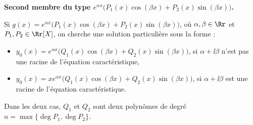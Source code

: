 \documentclass[class=report,crop=false]{standalone}
\begin{document}
\bigskip

\textbf{Second membre du type $e^{\alpha x}\big(P_1(x)\cos (\beta x)+P_2(x)\sin (\beta x)\big)$.}

Si $g(x)=e^{\alpha x} \big(P_1(x)\cos (\beta x)+P_2(x)\sin (\beta x)\big)$,
où $\alpha ,\beta \in \Rr$ et $P_1,P_2\in\Rr[X]$, on cherche une solution particulière sous la forme :
\begin{itemize}
\item $y_0(x)=e^{\alpha x} \big( Q_1(x)\cos (\beta x)+Q_2(x)\sin (\beta x) \big)$,
si $\alpha +\ii \beta$ n'est pas une racine de l'équation caractéristique,

\item $y_0(x)=xe^{\alpha x}  \big( Q_1(x)\cos (\beta x)+Q_2(x)\sin (\beta x) \big)$,
si $\alpha +\ii \beta$ est une racine de l'équation caractéristique.
\end{itemize}
Dans les deux cas, $Q_1$ et $Q_2$ sont deux polynômes
de degré $n=\max\{\deg P_1,\deg P_2\}$.
\end{document}
